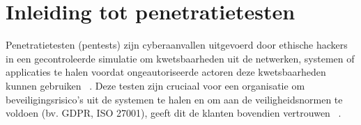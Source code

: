 



\section{Inleiding tot penetratietesten}
Penetratietesten (pentests) zijn cyberaanvallen uitgevoerd door ethische hackers in een gecontroleerde simulatie om kwetsbaarheden uit de netwerken, systemen of applicaties te halen voordat ongeautoriseerde actoren deze kwetsbaarheden kunnen gebruiken ~\autocite{Bindlish2021}. 
Deze testen zijn cruciaal voor een organisatie om beveiligingsrisico's uit de systemen te halen en om aan de veiligheidsnormen te voldoen (bv. GDPR, ISO 27001), geeft dit de klanten bovendien vertrouwen ~\parencite{Dalalana2017}.

